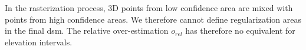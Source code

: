 \begin{remark}

    In the rasterization process, 3D points from low confidence area are mixed with points from high confidence areas. We therefore cannot define regularization areas in the final \acrshort{dsm}. The relative over-estimation $o_{rel}$ has therefore no equivalent for elevation intervals.  
\end{remark}


